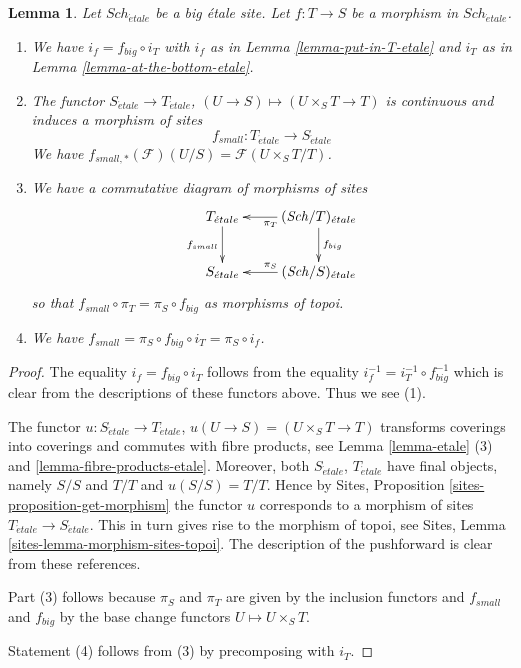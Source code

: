 \documentclass{stacks-project}
\theoremstyle{plain}
\newtheorem{lemma}[subsection]{Lemma}
\theoremstyle{definition}
\theoremstyle{remark}
\numberwithin{equation}{subsection}
\def\Sch{\mathit{Sch}}
\def\etale{{\acute{e}tale}}
\begin{document}
\begin{lemma}
\label{lemma-morphism-big-small-etale}
Let $\Sch_\etale$ be a big \'etale site.
Let $f : T \to S$ be a morphism in $\Sch_\etale$.
\begin{enumerate}
\item We have $i_f = f_{big} \circ i_T$ with $i_f$ as in
Lemma \ref{lemma-put-in-T-etale} and $i_T$ as in
Lemma \ref{lemma-at-the-bottom-etale}.
\item The functor $S_\etale \to T_\etale$,
$(U \to S) \mapsto (U \times_S T \to T)$ is continuous and induces
a morphism of sites
$$
f_{small} : T_\etale \longrightarrow S_\etale
$$
We have $f_{small, *}(\mathcal{F})(U/S) = \mathcal{F}(U \times_S T/T)$.
\item We have a commutative diagram of morphisms of sites
$$
\xymatrix{
T_\etale \ar[d]_{f_{small}} &
(\Sch/T)_\etale \ar[d]^{f_{big}} \ar[l]^{\pi_T}\\
S_\etale &
(\Sch/S)_\etale \ar[l]_{\pi_S}
}
$$
so that $f_{small} \circ \pi_T = \pi_S \circ f_{big}$ as morphisms of topoi.
\item We have $f_{small} = \pi_S \circ f_{big} \circ i_T = \pi_S \circ i_f$.
\end{enumerate}
\end{lemma}

\begin{proof}
The equality $i_f = f_{big} \circ i_T$ follows from the
equality $i_f^{-1} = i_T^{-1} \circ f_{big}^{-1}$ which is
clear from the descriptions of these functors above.
Thus we see (1).

\medskip\noindent
The functor
$u :
S_\etale
\to
T_\etale$, $u(U \to S) = (U \times_S T \to T)$
transforms coverings into coverings and commutes with fibre products,
see Lemma \ref{lemma-etale} (3) and \ref{lemma-fibre-products-etale}.
Moreover, both $S_\etale$, $T_\etale$ have final objects,
namely $S/S$ and $T/T$ and $u(S/S) = T/T$. Hence by
Sites, Proposition \ref{sites-proposition-get-morphism}
the functor $u$ corresponds to a morphism of sites
$T_\etale \to S_\etale$. This in turn gives rise to the
morphism of topoi, see
Sites, Lemma \ref{sites-lemma-morphism-sites-topoi}. The description
of the pushforward is clear from these references.

\medskip\noindent
Part (3) follows because $\pi_S$ and $\pi_T$ are given by the
inclusion functors and $f_{small}$ and $f_{big}$ by the
base change functors $U \mapsto U \times_S T$.

\medskip\noindent
Statement (4) follows from (3) by precomposing with $i_T$.
\end{proof}
\end{document}
